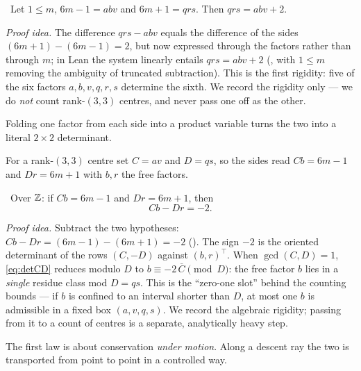 \begin{theorem}\label{thm:det_law_rank33}
\green{}\ Let $1\le m$, $6m-1=abv$ and $6m+1=qrs$. Then $qrs=abv+2$.
\end{theorem}

\emph{Proof idea.} The difference $qrs-abv$ equals the difference of the sides
$(6m+1)-(6m-1)=2$, but now expressed through the factors rather than through $m$; in Lean the system
linearly entails $qrs=abv+2$ (, with $1\le m$ removing the ambiguity of truncated
subtraction). This is the first rigidity: five of the six factors $a,b,v,q,r,s$ determine the
sixth. We record the rigidity only --- we do \emph{not} count rank-$(3,3)$ centres, and never pass
one off as the other.

Folding one factor from each side into a product variable turns the two into a literal $2\times2$
determinant.

\begin{definition}\label{def:product-coords}
For a rank-$(3,3)$ centre set $C=av$ and $D=qs$, so the sides read $Cb=6m-1$ and $Dr=6m+1$ with
$b,r$ the free factors.
\end{definition}

\begin{theorem}\label{thm:det_law_CD}
\green{}\ Over $\mathbb{Z}$: if $Cb=6m-1$ and $Dr=6m+1$, then
\begin{equation}\label{eq:detCD}
Cb-Dr=-2.
\end{equation}
\end{theorem}

\emph{Proof idea.} Subtract the two hypotheses: $Cb-Dr=(6m-1)-(6m+1)=-2$ (). The sign $-2$ is the oriented determinant of the rows $(C,-D)$ against $(b,r)^\top$. When
$\gcd(C,D)=1$, \cref{eq:detCD} reduces modulo $D$ to $b\equiv-2\,\overline{C}\pmod D$: the free
factor $b$ lies in a \emph{single} residue class mod $D=qs$. This is the ``zero-one slot'' behind
the counting bounds --- if $b$ is confined to an interval shorter than $D$, at most one $b$ is
admissible in a fixed box $(a,v,q,s)$. We record the algebraic rigidity; passing from it to a count
of centres is a separate, analytically heavy step.

The first law is about conservation \emph{under motion}. Along a descent ray the two is transported
from point to point in a controlled way.

